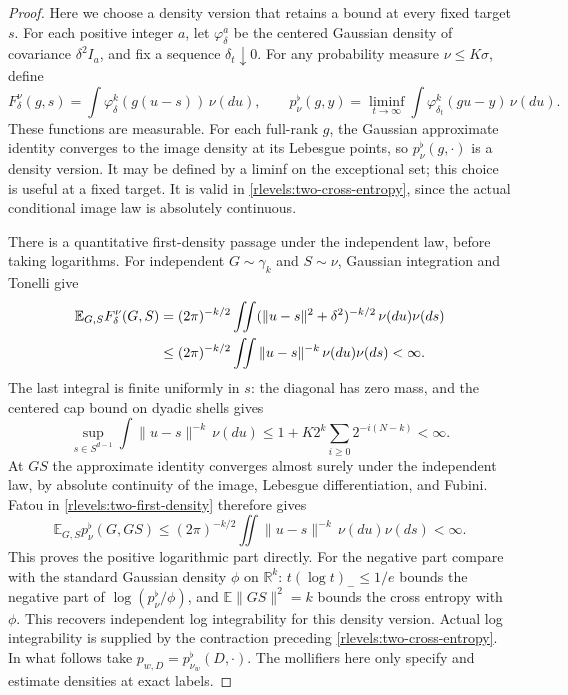 \begin{proof}
Here we choose a density version that retains a bound at every fixed
target \(s\).  For each positive integer \(a\), let
\(\varphi_\delta^a\) be the centered Gaussian density of covariance
\(\delta^2I_a\), and fix a sequence \(\delta_t\downarrow0\).
For any probability measure \(\nu\le K\sigma\), define
\[
 F_\delta^\nu(g,s)
   =\int\varphi_\delta^k(g(u-s))\,\nu(du),\qquad
 p^\flat_\nu(g,y)
   =\liminf_{t\to\infty}
       \int\varphi_{\delta_t}^k(gu-y)\,\nu(du).
\]
These functions are measurable.  For each full-rank \(g\), the
Gaussian approximate identity converges to the image density at its
Lebesgue points, so \(p^\flat_\nu(g,\cdot)\) is a density version.
It may be defined by a liminf on the exceptional set; this choice is
useful at a fixed target.  It is valid in
\eqref{rlevels:two-cross-entropy}, since the actual conditional image
law is absolutely continuous.

There is a quantitative first-density passage under the independent
law, before taking logarithms.  For independent \(G\sim\gamma_k\)
and \(S\sim\nu\), Gaussian integration and Tonelli give
\begin{align}
 \mathbb E_{G,S}F_\delta^\nu(G,S)
 &= (2\pi)^{-k/2}\iint
       (\|u-s\|^2+\delta^2)^{-k/2}\,\nu(du)\nu(ds) \notag\\
 &\le (2\pi)^{-k/2}\iint
       \|u-s\|^{-k}\,\nu(du)\nu(ds)<\infty.
 \label{rlevels:two-first-density}
\end{align}
The last integral is finite uniformly in \(s\): the diagonal has
zero mass, and the centered cap bound on dyadic shells gives
\[
 \sup_{s\in S^{d-1}}\int\|u-s\|^{-k}\,\nu(du)
 \le 1+K2^k\sum_{i\ge0}2^{-i(N-k)}<\infty.
\]
At \(GS\) the approximate identity converges almost surely under
the independent law, by absolute continuity of the image, Lebesgue
differentiation, and Fubini.  Fatou in
\eqref{rlevels:two-first-density} therefore gives
\[
 \mathbb E_{G,S}p^\flat_\nu(G,GS)
 \le (2\pi)^{-k/2}\iint\|u-s\|^{-k}\,\nu(du)\nu(ds)<\infty.
\]
This proves the positive logarithmic part directly.  For the negative
part compare with the standard Gaussian density \(\phi\) on
\(\mathbb R^k\): \(t(\log t)_-\le1/e\) bounds the negative part
of \(\log(p^\flat_\nu/\phi)\), and
\(\mathbb E\|GS\|^2=k\) bounds the cross entropy with \(\phi\).
This recovers independent log integrability for this density version.
Actual log integrability is supplied by the contraction preceding
\eqref{rlevels:two-cross-entropy}.  In what follows take
\(p_{w,D}=p^\flat_{\nu_w}(D,\cdot)\).  The mollifiers here only
specify and estimate densities at exact labels.


\end{proof}
